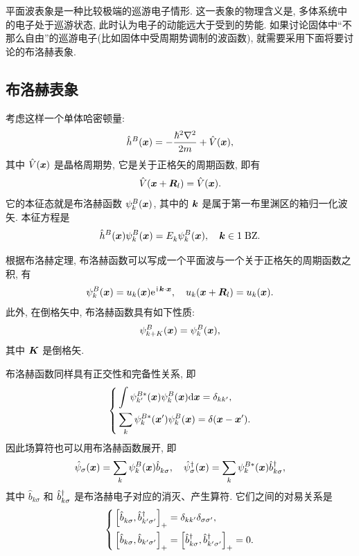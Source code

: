 平面波表象是一种比较极端的巡游电子情形. 这一表象的物理含义是, 多体系统中的电子处于巡游状态, 此时认为电子的动能远大于受到的势能. 如果讨论固体中“不那么自由”的巡游电子(比如固体中受周期势调制的波函数), 就需要采用下面将要讨论的布洛赫表象. 

\subsection{布洛赫表象}
考虑这样一个单体哈密顿量: 
\begin{equation}
   \hat h^B(\boldsymbol{x})=-\frac{\hbar^2\nabla^2}{2m}+\hat{V}(\boldsymbol{x}), 
\end{equation}
其中 $\hat V(\boldsymbol{x})$ 是晶格周期势, 它是关于正格矢的周期函数, 即有
\begin{equation}
   \hat V(\boldsymbol{x}+\boldsymbol{R}_l)=\hat V(\boldsymbol{x}). 
\end{equation}
它的本征态就是布洛赫函数 $\psi_{ k}^B(\boldsymbol{x})$, 其中的 $\boldsymbol{k}$ 是属于第一布里渊区的箱归一化波矢. 本征方程是
\begin{equation}
   \hat h^B(\boldsymbol{x})\psi_{ k}^B(\boldsymbol{x})=E^{}_{ k}\psi_{ k}^B(\boldsymbol{x}), \quad \boldsymbol{k}\in \mathrm{1\;BZ}. 
\end{equation} 

根据布洛赫定理, 布洛赫函数可以写成一个平面波与一个关于正格矢的周期函数之积, 有
\begin{equation}
   \psi_{ k}^B(\boldsymbol{x})=u_{ k}(\boldsymbol{x})\mathrm{e}^{\hspace{0.1em}\mathrm{i}\hspace{0.1em}\boldsymbol{k}\cdot\boldsymbol{x}}, \quad u_{ k}(\boldsymbol{x}+\boldsymbol{R}_l)=u_{k}(\boldsymbol{x}). 
\end{equation}
此外, 在倒格矢中, 布洛赫函数具有如下性质: 
\begin{equation}
   \psi_{{k+K}}^B(\boldsymbol{x})=\psi_{{k}}^B(\boldsymbol{x}), 
\end{equation}
其中 $\boldsymbol{K}$ 是倒格矢. 

布洛赫函数同样具有正交性和完备性关系, 即
\begin{equation}
   \left\{
\begin{aligned}
   &\int\psi_{ k'}^{B*}(\boldsymbol{x})\psi_{ k}^B(\boldsymbol{x})\mathrm{d}\boldsymbol{x}=\delta_{{kk'}}, \\
   &\sum_{ k}\psi_{ k}^{B*}(\boldsymbol{x}')\psi_{ k}^B(\boldsymbol{x})=\delta(\boldsymbol{x}-\boldsymbol{x}'). 
\end{aligned}
   \right. 
\end{equation}
因此场算符也可以用布洛赫函数展开, 即
\begin{equation}
   \hat\psi_\sigma(\boldsymbol{x})=\sum_{ k}\psi_{ k}^B(\boldsymbol{x})\hat b^{}_{ k\sigma}, \quad \hat\psi_{\sigma}^\dagger (\boldsymbol{x})=\sum_{ k}\psi_{ k}^{B*}(\boldsymbol{x})\hat b_{ k\sigma}^\dagger, 
\end{equation}
其中 $\hat b^{}_{k\sigma}$ 和 $\hat b_{ k\sigma}^\dagger$ 是布洛赫电子对应的消灭、产生算符. 它们之间的对易关系是
\begin{equation}
   \left\{
\begin{aligned}
   &\left[ \hat b^{}_{ k\sigma}, \hat b_{k'\sigma'}^\dagger \right]_+=\delta_{{kk}'}\delta_{\sigma\sigma'}, \\
   &\left[ \hat b_{ k\sigma}, \hat b_{k'\sigma'} \right]_+=\left[ \hat b_{ k\sigma}^\dagger, \hat b_{{k'}\sigma'}^\dagger \right]_+=0. 
\end{aligned}
   \right. 
\end{equation}

